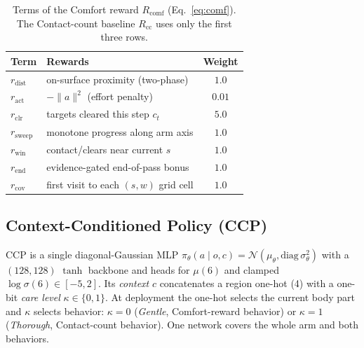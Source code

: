\documentclass[conference]{IEEEtran}
\newcommand{\Rcomf}{R_{\mathrm{comf}}}
\newcommand{\Rcc}{R_{\mathrm{cc}}}
\begin{document}
\begin{table}[t]
\centering\small
\caption{Terms of the Comfort reward $\Rcomf$ (Eq.~\ref{eq:comf}). The Contact-count baseline
$\Rcc$ uses only the first three rows.}
\label{tab:reward}
\begin{tabular}{llc}
\toprule
\textbf{Term} & \textbf{Rewards} & \textbf{Weight}\\
\midrule
$r_{\text{dist}}$  & on-surface proximity (two-phase)        & $1.0$\\
$r_{\text{act}}$   & $-\lVert a\rVert^2$ (effort penalty)     & $0.01$\\
$r_{\text{clr}}$   & targets cleared this step $c_t$          & $5.0$\\
$r_{\text{sweep}}$ & monotone progress along arm axis         & $1.0$\\
$r_{\text{win}}$   & contact/clears near current $s$          & $1.0$\\
$r_{\text{end}}$   & evidence-gated end-of-pass bonus         & $1.0$\\
$r_{\text{cov}}$   & first visit to each $(s,w)$ grid cell    & $1.0$\\
\bottomrule
\end{tabular}
\end{table}

\subsection{Context-Conditioned Policy (CCP)}
CCP is a single diagonal-Gaussian MLP
$\pi_\theta(a\mid o,c){=}\mathcal{N}(\mu_\theta,\mathrm{diag}\,\sigma_\theta^2)$ with a
$(128,128)$ $\tanh$ backbone and heads for $\mu(6)$ and clamped $\log\sigma(6)\in[-5,2]$. Its
\emph{context} $c$ concatenates a region one-hot (4) with a one-bit \emph{care level}
$\kappa\in\{0,1\}$. At deployment the one-hot selects the current body part and $\kappa$
selects behavior: $\kappa{=}0$ (\emph{Gentle}, Comfort-reward behavior) or $\kappa{=}1$
(\emph{Thorough}, Contact-count behavior). One network covers the whole arm and both behaviors.
\end{document}
